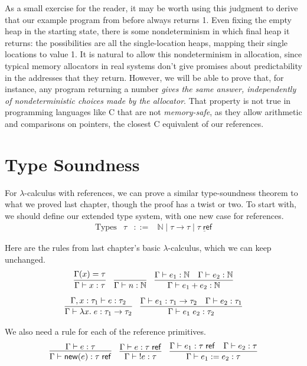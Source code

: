 \documentclass{amsbook}
\theoremstyle{definition}
\theoremstyle{remark}
\numberwithin{section}{chapter}
\numberwithin{equation}{chapter}
\begin{document}
As a small exercise for the reader, it may be worth using this judgment to derive that our example program from before always returns 1.
Even fixing the empty heap in the starting state, there is some nondeterminism in which final heap it returns: the possibilities are all the single-location heaps, mapping their single locations to value 1.
It is natural to allow this nondeterminism in allocation, since typical memory allocators in real systems don't give promises about predictability in the addresses that they return.
However, we will be able to prove that, for instance, any program returning a number \emph{gives the same answer, independently of nondeterministic choices made by the allocator}.
That property is not true in programming languages like C that are not \emph{memory-safe}, as they allow arithmetic and comparisons on pointers, the closest C equivalent of our references.


\section{Type Soundness}

\newcommand{\reft}[1]{#1 \; \mathsf{ref}}

For $\lambda$-calculus with references, we can prove a similar type-soundness theorem to what we proved last chapter, though the proof has a twist or two.
To start with, we should define our extended type system, with one new case for references.
$$\begin{array}{rrcl}
  \textrm{Types} & \tau &::=& \mathbb N \mid \tau \to \tau \mid \underline{\reft{\tau}}
\end{array}$$

Here are the rules from last chapter's basic $\lambda$-calculus, which we can keep unchanged.
$$\infer{\hasty{\Gamma}{x}{\tau}}{
  \msel{\Gamma}{x} = \tau
}
\quad \infer{\hasty{\Gamma}{n}{\mathbb N}}{}
\quad \infer{\hasty{\Gamma}{e_1 + e_2}{\mathbb N}}{
    \hasty{\Gamma}{e_1}{\mathbb N}
    & \hasty{\Gamma}{e_2}{\mathbb N}
}$$
$$\infer{\hasty{\Gamma}{\lambda x. \; e}{\tau_1 \to \tau_2}}{
  \hasty{\Gamma, x : \tau_1}{e}{\tau_2}
}
\quad \infer{\hasty{\Gamma}{e_1 \; e_2}{\tau_2}}{
  \hasty{\Gamma}{e_1}{\tau_1 \to \tau_2}
  & \hasty{\Gamma}{e_2}{\tau_1}
}$$

We also need a rule for each of the reference primitives.
$$\infer{\hasty{\Gamma}{\newref{e}}{\reft{\tau}}}{
  \hasty{\Gamma}{e}{\tau}
}
\quad \infer{\hasty{\Gamma}{\; \readref{e}}{\tau}}{
    \hasty{\Gamma}{e}{\reft{\tau}}
}
\quad \infer{\hasty{\Gamma}{\writeref{e_1}{e_2}}{\tau}}{
  \hasty{\Gamma}{e_1}{\reft{\tau}}
  & \hasty{\Gamma}{e_2}{\tau}
}$$
\end{document}
